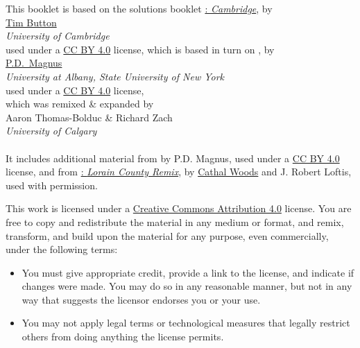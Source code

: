 \noindent This booklet is based on the solutions booklet \href{http://people.ds.cam.ac.uk/tecb2/forallx.shtml}{\forallx:\emph{ Cambridge}}, by\\[2ex]
\href{http://people.ds.cam.ac.uk/tecb2/index.shtml}{Tim Button}\\
\emph{University of Cambridge}\\[2ex]
used under a \href{https://creativecommons.org/licenses/by/4.0/}{CC BY 4.0} license, which is based in turn on \href{https://www.fecundity.com/logic/}{\forallx}, by\\[2ex]
\href{https://www.fecundity.com/job/}{P.D.\ Magnus}\\
\emph{University at Albany, State University of New York}\\[2ex]
used under a \href{https://creativecommons.org/licenses/by/4.0/}{CC BY 4.0} license,
\\
which was remixed \& expanded by\\[2ex] {Aaron Thomas-Bolduc \& Richard Zach}\\
\emph{University of Calgary}
\\
\\
It includes additional material from \forallx{} by P.D. Magnus, used under
a \href{https://creativecommons.org/licenses/by/4.0/}{CC BY 4.0}
license, and from \href{https://github.com/rob-helpy-chalk/openintroduction}{\forallx: \emph{Lorain County Remix}}, by \href{https://sites.google.com/site/cathalwoods/}{Cathal
Woods} and J. Robert Loftis, used with permission.

\bigskip

\noindent This work is licensed under a \href{https://creativecommons.org/licenses/by/4.0/}{Creative Commons Attribution 4.0} license. 
You are free to copy and redistribute the material in any medium or format, and  remix, transform, and build upon the material for any purpose, even commercially, under the following terms:
\begin{itemize}
\item You must give appropriate credit, provide a link to the license, and indicate if changes were made. You may do so in any reasonable manner, but not in any way that suggests the licensor endorses you or your use.
\item You may not apply legal terms or technological measures that legally restrict others from doing anything the license permits.
\end{itemize}
